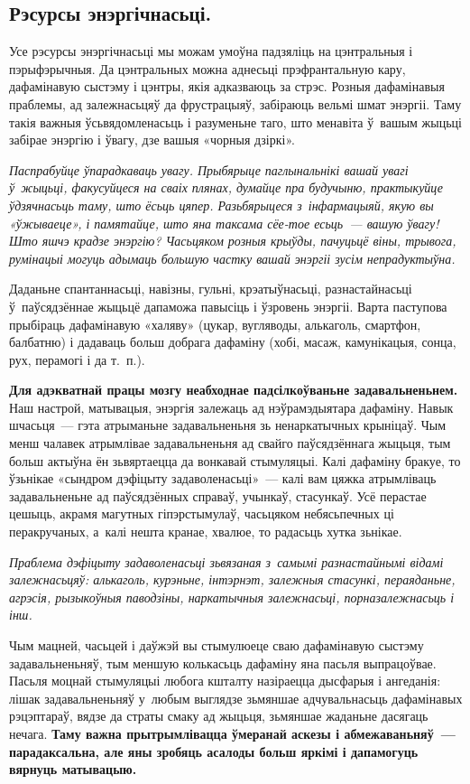 \subsection*{Рэсурсы энэргічнасьці.}

Усе рэсурсы энэргічнасьці мы можам умоўна падзяліць на цэнтральныя і пэрыфэрычныя. Да цэнтральных можна аднесьці прэфрантальную кару, дафамінавую сыстэму і цэнтры, якія адказваюць за стрэс. Розныя дафамінавыя праблемы, ад залежнасьцяў да фрустрацыяў, забіраюць вельмі шмат энэргіі. Таму такія важныя ўсьвядомленасьць і разуменьне таго, што менавіта ў~вашым жыцьці забірае энэргію і ўвагу, дзе вашыя «чорныя дзіркі».

\emph{Паспрабуйце ўпарадкаваць увагу. Прыбярыце паглынальнікі вашай увагі ў~жыцьці, факусуйцеся на сваіх плянах, думайце пра будучыню, практыкуйце ўдзячнасьць таму, што ёсьць цяпер. Разьбярыцеся з~інфармацыяй, якую вы «ўжываеце», і памятайце, што яна таксама сёе-тое есьць~--- вашую ўвагу! Што яшчэ крадзе энэргію? Часьцяком розныя крыўды, пачуцьцё віны, трывога, румінацыі могуць адымаць большую частку вашай энэргіі зусім непрадуктыўна.}

Даданьне спантаннасьці, навізны, гульні, крэатыўнасьці, разнастайнасьці ў~паўсядзённае жыцьцё дапаможа павысіць і ўзровень энэргіі. Варта паступова прыбіраць дафамінавую «халяву» (цукар, вугляводы, алькаголь, смартфон, балбатню) і дадаваць больш добрага дафаміну (хобі, масаж, камунікацыя, сонца, рух, перамогі і да т.~п.).

\textbf{Для адэкватнай працы мозгу неабходнае падсілкоўваньне задавальненьнем.} Наш настрой, матывацыя, энэргія залежаць ад нэўрамэдыятара дафаміну. Навык шчасьця~--- гэта атрыманьне задавальненьня зь ненаркатычных крыніцаў. Чым менш чалавек атрымлівае задавальненьня ад свайго паўсядзённага жыцьця, тым больш актыўна ён зьвяртаецца да вонкавай стымуляцыі. Калі дафаміну бракуе, то ўзьнікае «сындром дэфіцыту задаволенасьці»~--- калі вам цяжка атрымліваць задавальненьне ад паўсядзённых справаў, учынкаў, стасункаў. Усё перастае цешыць, акрамя магутных гіпэрстымулаў, часьцяком небясьпечных ці перакручаных, а~калі нешта кранае, хвалюе, то радасьць хутка зьнікае.

\emph{Праблема дэфіцыту задаволенасьці зьвязаная з~самымі разнастайнымі відамі залежнасьцяў: алькаголь, курэньне, інтэрнэт, залежныя стасункі, пераяданьне, агрэсія, рызыкоўныя паводзіны, наркатычныя залежнасьці, порназалежнасьць і інш.}

Чым мацней, часьцей і даўжэй вы стымулюеце сваю дафамінавую сыстэму задавальненьняў, тым меншую колькасьць дафаміну яна пасьля выпрацоўвае. Пасьля моцнай стымуляцыі любога кшталту назіраецца дысфарыя і ангеданія: лішак задавальненьняў у~любым выглядзе зьмяншае адчувальнасьць дафамінавых рэцэптараў, вядзе да страты смаку ад жыцьця, зьмяншае жаданьне дасягаць нечага. \textbf{Таму важна прытрымлівацца ўмеранай аскезы і абмежаваньняў~--- парадаксальна, але яны зробяць асалоды больш яркімі і дапамогуць вярнуць матывацыю.}

